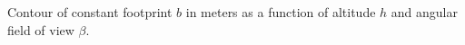 \label{fig:footprint} Contour of constant footprint $b$ in meters as a function of altitude $h$ and angular field of view $\beta$.